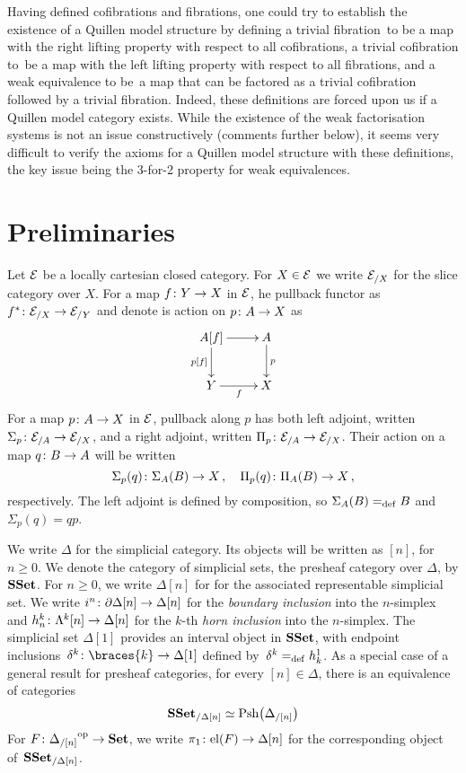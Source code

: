 \documentclass[reqno,10pt,a4paper,oneside,draft]{amsart}
\begin{document}
 \medskip

Having defined cofibrations and fibrations, one could try to establish the existence of a Quillen model structure by defining a trivial fibration~to be a map with the right lifting property with respect to all cofibrations, a trivial cofibration to~be a map with the left lifting property with respect to all fibrations, and a weak equivalence to be~a map that can be factored as a trivial cofibration followed by a trivial fibration. Indeed, 
these definitions are forced upon us if a Quillen model category exists. While the existence of the weak
factorisation systems is not an issue constructively (\cf comments further below), it seems  very difficult to verify the axioms for a Quillen model structure with these definitions, the key issue being  the  3-for-2 property for weak equivalences.  



\section{Preliminaries} 

Let $\mathcal{E}$  be a locally cartesian closed category. For $X \in \mathcal{E}$ we write $\mathcal{E}_{/X}$ for the slice category over $X$. For a map $f \colon Y \to X$ in $\mathcal{E}$, he pullback functor as $f^* \colon \mathcal{E}_{/X} \to \mathcal{E}_{/Y}$
and denote is action on $p \colon A \to X$ as 
\[
\xymatrix{
A[f] \ar[r] \ar[d]_{p[f]} & A \ar[d]^p \\
Y \ar[r]_f & X }
\]
For a map $p \colon A \to X$ in $\mathcal{E}$, pullback along $p$ has both left adjoint, written $\Sigma_p \colon \mathcal{E}_{/A}
\to \mathcal{E}_{/X}$, and a right adjoint, written $\Pi_p \colon \mathcal{E}_{/A} \to \mathcal{E}_{/X}$. Their action on a
map $q \colon B \to A$ will be written
\[
 \Sigma_p(q) \colon \Sigma_A(B) \to X \, , \quad \Pi_p(q) \colon \Pi_A(B) \to X \, ,
 \]
respectively. The left adjoint is defined by composition, so $\Sigma_A(B) =_{\operatorname{def}} B$ and $\Sigma_p(q) = qp$.


\medskip



\medskip




We write $\Delta$ for the simplicial category. Its objects will be written as $[n]$, for $n \geq 0$. We denote
the category of simplicial sets, \ie the presheaf category over $\Delta$, by $\mathbf{SSet}$. 
 For $n \geq 0$, we write $\Delta[n]$ for for the
associated representable simplicial set. We write $i^n \colon  \partial \Delta[n] \to \Delta[n]$ for the \emph{boundary inclusion} into the $n$-simplex and  $h^k_n  \colon \Lambda^k[n] \to \Delta[n]$ for the $k$-th \emph{horn inclusion} into the $n$-simplex. The simplicial set $\Delta[1]$ provides an interval object in $\mathbf{SSet}$, with endpoint inclusions~$\kcyl \co \braces{ k} \to \Delta[1]$ defined by~$\delta^k =_{\operatorname{def}} h^1_k$.
As a special case of a general result for presheaf categories, for every $[n] \in \Delta$, there is an equivalence of categories
\begin{equation}
\label{equ:pshslice}
\mathbf{SSet}_{/\Delta[n]} \simeq \mathrm{Psh} \big( \Delta_{/[n]} \big )
\end{equation}
For $F \colon {\Delta_{/[n]}}^{\operatorname{op}} \to \mathbf{Set}$, we write $\pi_1 \colon \mathrm{el}(F) \to \Delta[n]$
for the corresponding object of~$\mathbf{SSet}_{/\Delta[n]}$.
\end{document}

